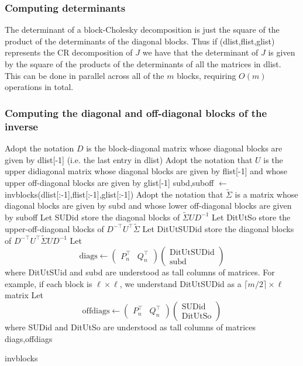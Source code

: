 \documentclass{article}
\theoremstyle{definition}
\begin{document}
\subsubsection{Computing determinants}

The determinant of a block-Cholesky decomposition is just the square of the product of the determinants of the diagonal blocks.  Thus if (dlist,flist,glist) represents the CR decomposition of $J$ we have that the determinant of $J$ is given by the square of the products of the determinants of all the matrices in dlist.  This can be done in parallel across all of the $m$ blocks, requiring $O(m)$ operations in total.

\subsubsection{Computing the diagonal and off-diagonal blocks of the inverse}


\begin{algorithm}[H]
 Adopt the notation $D$ is the block-diagonal matrix whose diagonal blocks are given by dlist[-1] (i.e. the last entry in dlist)\;
 Adopt the notation that $U$ is the upper didiagonal matrix whose diagonal blocks are given by flist[-1] and whose upper off-diagonal blocks are given by glist[-1]\;
 {
    subd,suboff $\gets$ invblocks(dlist[:-1],flist[:-1],glist[:-1])\;
    Adopt the notation that $\tilde \Sigma$ is a matrix whose diagonal blocks are given by subd and whose lower off-diagonal blocks are given by suboff\;
    Let SUDid store the diagonal blocks of $\tilde\Sigma U D^{-1}$\;
    Let DitUtSo store the upper-off-diagonal blocks of $D^{-\top}U^{\top}\tilde\Sigma$\;
    Let DitUtSUDid store the diagonal blocks of $D^{-\top} U^\top \tilde\Sigma U D^{-1}$\;
    Let 
    \[
    \mathrm{diags} \gets \left(\begin{array}{cc}
    P_{n}^{\top} & Q_{n}^{\top}\end{array}\right)\left(\begin{array}{c}
    \mathrm{DitUtSUDid}\\
    \mathrm{subd}
    \end{array}\right)
    \]
    where DitUtSUid and subd are understood as tall columns of matrices.  For example, if each block is $\ell \times \ell$, we understand DitUtSUDid as a $\lceil m/2\rceil \times \ell$ matrix\;
    Let
    \[
    \mathrm{offdiags} \gets
    \left(\begin{array}{cc}
    P_{n}^{\top} & Q_{n}^{\top}\end{array}\right)\left(\begin{array}{c}
    \mathrm{SUDid}\\
    \mathrm{DitUtSo}
    \end{array}\right)
    \]
    where SUDid and DitUtSo are understood as tall columns of matrices\;
    \Return diags,offdiags\;
 }
 \caption{invblocks}
\end{algorithm}
\end{document}

